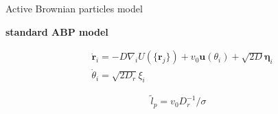 \documentclass{beamer}
\begin{document}

\begin{frame}[c]{Active Brownian particles model}


\begin{minipage}[c]{0.30\linewidth}
\begin{figure}
\centering

\end{figure}
\end{minipage}
\hfill
\begin{minipage}[c]{0.65\linewidth}

\begin{center}
\bf standard ABP model
\end{center}
\begin{eqnarray}
&\dot{\boldsymbol{r}}_i = - D \nabla_i U(\{\boldsymbol{r}_j\}) + v_0 \boldsymbol{u}(\theta_i) + \sqrt{2 D} \boldsymbol{\eta}_i\\
&\dot{\theta}_i = \sqrt{2 D_r} \xi_i
\end{eqnarray}

\return
\begin{equation}
\tilde{l}_p = v_0 D_r^{-1} / \sigma
\end{equation}

\end{minipage}

\end{frame}
\end{document}
